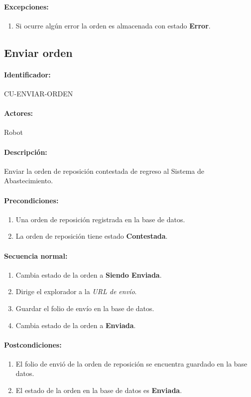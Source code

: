 \paragraph{Excepciones:}
\begin{enumerate}
  \item Si ocurre algún error la orden es almacenada con estado \textbf{Error}.
\end{enumerate}


\subsection{Enviar orden}\label{cu-enviar-orden}
\paragraph{Identificador:}
CU-ENVIAR-ORDEN
\paragraph{Actores:}
Robot
\paragraph{Descripción:}
Enviar la orden de reposición contestada de regreso al Sistema de Abastecimiento.
\paragraph{Precondiciones:}
\begin{enumerate}
  \item Una orden de reposición registrada en la base de datos.
  \item La orden de reposición tiene estado \textbf{Contestada}.
\end{enumerate}
\paragraph{Secuencia normal:}
\begin{enumerate}
  \item Cambia estado de la orden a \textbf{Siendo Enviada}.
  \item Dirige el explorador a la \textit{URL de envío}.
  \item Guardar el folio de envío en la base de datos.
  \item Cambia estado de la orden a \textbf{Enviada}.
\end{enumerate}
\paragraph{Postcondiciones:}
\begin{enumerate}
  \item El folio de envió de la orden de reposición se encuentra guardado en la base datos.
  \item El estado de la orden en la base de datos es \textbf{Enviada}.
\end{enumerate}
